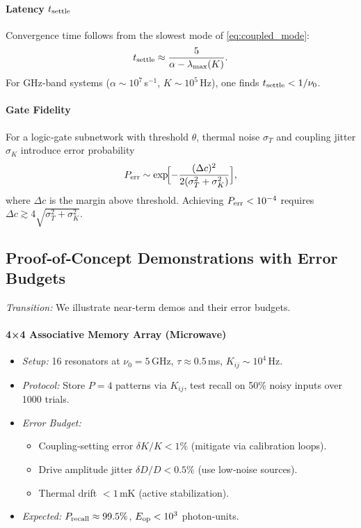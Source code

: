 \paragraph{Latency $t_{\rm settle}$}  
Convergence time follows from the slowest mode of \eqref{eq:coupled_mode}:
\[
t_{\rm settle} \approx \frac{5}{\alpha - \lambda_{\max}(K)}.
\]
For GHz‐band systems ($\alpha\sim10^7\,$s$^{-1}$, $K\sim10^5\,$Hz), one finds $t_{\rm settle}<1/\nu_0$.

\paragraph{Gate Fidelity}  
For a logic‐gate subnetwork with threshold $\theta$, thermal noise $\sigma_T$ and coupling jitter $\sigma_K$ introduce error probability
\[
P_{\rm err} \sim \exp\!\Bigl[-\frac{(\Delta c)^2}{2(\sigma_T^2 + \sigma_K^2)}\Bigr],
\]
where $\Delta c$ is the margin above threshold.  Achieving $P_{\rm err}<10^{-4}$ requires $\Delta c\gtrsim4\sqrt{\sigma_T^2+\sigma_K^2}$.

\subsection{Proof‐of‐Concept Demonstrations with Error Budgets}
\emph{Transition:} We illustrate near‐term demos and their error budgets.

\paragraph{4×4 Associative Memory Array (Microwave)}  
\begin{itemize}
  \item \emph{Setup:} 16 resonators at $\nu_0=5\,$GHz, $\tau\approx0.5\,$ms, $K_{ij}\sim10^4\,$Hz.
  \item \emph{Protocol:} Store $P=4$ patterns via $K_{ij}$, test recall on 50\% noisy inputs over 1000 trials.
  \item \emph{Error Budget:}
    \begin{itemize}
      \item Coupling‐setting error $\delta K/K<1\%$ (mitigate via calibration loops).
      \item Drive amplitude jitter $\delta D/D<0.5\%$ (use low‐noise sources).
      \item Thermal drift $<1\,$mK (active stabilization).
    \end{itemize}
  \item \emph{Expected:} $P_{\rm recall}\approx99.5\%$, $E_{\rm op}<10^3$ photon‐units.
\end{itemize}

